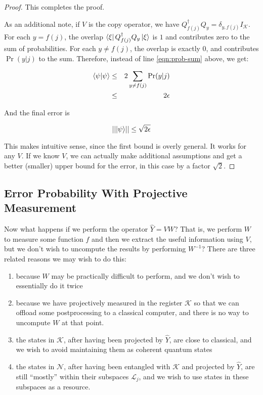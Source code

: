 \begin{proof}
This completes the proof.

As an additional note, if $V$ is the copy operator, we have
$Q_{f(j)}^{\dagger}Q_y = \delta_{y,f(j)}I_{\mathcal{K}}$.
For each $y = f(j)$, the overlap $\left\langle{\xi}\right\vert Q_{f(j)}^{\dagger}Q_y \left\vert{\xi}\right\rangle$
is $1$ and contributes zero to the sum of probabilities.
For each $y \ne f(j)$, the overlap is exactly $0$, and contributes
$\Pr(y|j)$ to the sum.
Therefore, instead of line \ref{eqn:prob-sum} above, we get:

\begin{eqnarray}
\langle \psi|\psi \rangle & \le & 2\sum_{y \ne f(j)} \Pr(y|j)\\
                    & \le & 2\epsilon
\end{eqnarray}

And the final error is

\begin{equation}
\lvert\lvert \left\vert{\psi}\right\rangle \rvert\rvert \le \sqrt{2\epsilon}
\end{equation}

This makes intuitive sense, since the first bound is overly general.
It works for any $V$. If we know $V$, we can actually make additional
assumptions and get a better (smaller) upper bound for the error, in this
case by a factor $\sqrt{2}$.
\end{proof}

\subsection{Error Probability With Projective Measurement}
\label{subsec:error-proj}

Now what happens if we perform the operator $\hat{Y} = VW$? That is, we
perform $W$ to measure some function $f$ and then we extract the useful
information using $V$, but we don't wish to uncompute the results by
performing $W^{-1}$? There are three related reasons we may wish to do this:

\begin{enumerate}
\item
because $W$ may be practically difficult to perform, and we don't wish
to essentially do it twice
\item
because we have projectively measured
in the register $\mathcal{K}$ so that we can offload some postprocessing to
a classical computer, and there is no way to uncompute $W$ at that point.
\item
the states in $\mathcal{K}$, after having been projected by $\hat{Y}$,
are close to classical, and we wish to avoid maintaining them as coherent
quantum states
\item
the states in $\mathcal{N}$, after having been entangled with $\mathcal{K}$ and
projected by $\hat{Y}$, are still ``mostly'' within their subspaces
$\mathcal{L}_j$, and we wish to use states in these subspaces as a resource.
\end{enumerate}

